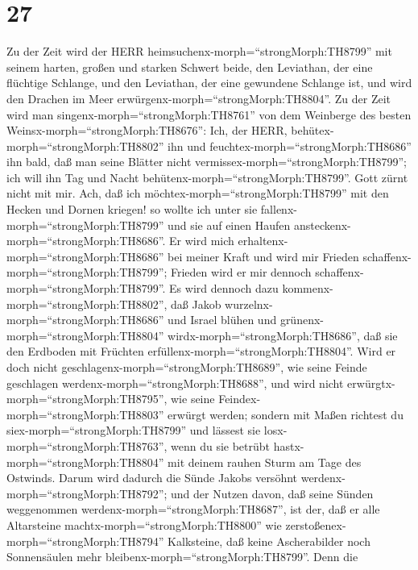\hypertarget{section-26}{%
\section{27}\label{section-26}}

 Zu der Zeit wird der HERR
heimsuchenx-morph=``strongMorph:TH8799'' mit seinem harten, großen und
starken Schwert beide, den Leviathan, der eine flüchtige Schlange, und
den Leviathan, der eine gewundene Schlange ist, und wird den Drachen im
Meer erwürgenx-morph=``strongMorph:TH8804''.  Zu der Zeit
wird man singenx-morph=``strongMorph:TH8761'' von dem Weinberge des
besten Weinsx-morph=``strongMorph:TH8676'':  Ich, der HERR,
behütex-morph=``strongMorph:TH8802'' ihn und
feuchtex-morph=``strongMorph:TH8686'' ihn bald, daß man seine Blätter
nicht vermissex-morph=``strongMorph:TH8799''; ich will ihn Tag und Nacht
behütenx-morph=``strongMorph:TH8799''.  Gott zürnt nicht mit
mir. Ach, daß ich möchtex-morph=``strongMorph:TH8799'' mit den Hecken
und Dornen kriegen! so wollte ich unter sie
fallenx-morph=``strongMorph:TH8799'' und sie auf einen Haufen
ansteckenx-morph=``strongMorph:TH8686''.  Er wird mich
erhaltenx-morph=``strongMorph:TH8686'' bei meiner Kraft und wird mir
Frieden schaffenx-morph=``strongMorph:TH8799''; Frieden wird er mir
dennoch schaffenx-morph=``strongMorph:TH8799''.  Es wird
dennoch dazu kommenx-morph=``strongMorph:TH8802'', daß Jakob
wurzelnx-morph=``strongMorph:TH8686'' und Israel blühen und
grünenx-morph=``strongMorph:TH8804'' wirdx-morph=``strongMorph:TH8686'',
daß sie den Erdboden mit Früchten
erfüllenx-morph=``strongMorph:TH8804''.  Wird er doch nicht
geschlagenx-morph=``strongMorph:TH8689'', wie seine Feinde geschlagen
werdenx-morph=``strongMorph:TH8688'', und wird nicht
erwürgtx-morph=``strongMorph:TH8795'', wie seine
Feindex-morph=``strongMorph:TH8803'' erwürgt werden; 
sondern mit Maßen richtest du siex-morph=``strongMorph:TH8799'' und
lässest sie losx-morph=``strongMorph:TH8763'', wenn du sie betrübt
hastx-morph=``strongMorph:TH8804'' mit deinem rauhen Sturm am Tage des
Ostwinds.  Darum wird dadurch die Sünde Jakobs versöhnt
werdenx-morph=``strongMorph:TH8792''; und der Nutzen davon, daß seine
Sünden weggenommen werdenx-morph=``strongMorph:TH8687'', ist der, daß er
alle Altarsteine machtx-morph=``strongMorph:TH8800'' wie
zerstoßenex-morph=``strongMorph:TH8794'' Kalksteine, daß keine
Ascherabilder noch Sonnensäulen mehr
bleibenx-morph=``strongMorph:TH8799''.  Denn die
